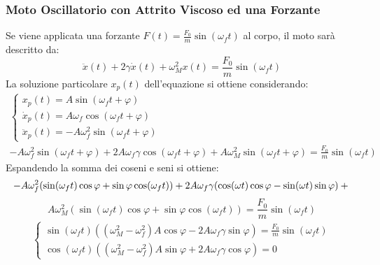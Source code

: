 \documentclass{article}
\numberwithin{equation}{subsection}
\begin{document}
\subsubsection{Moto Oscillatorio con Attrito Viscoso ed una Forzante}
Se viene applicata una forzante $F(t)=\displaystyle\frac{F_0}{m}\sin(\omega_f t)$ 
al corpo, il moto sarà descritto da: 
\begin{equation}
    \ddot x(t)+2\gamma\dot x(t)+\omega_M^{2}x(t)=\displaystyle\frac{F_0}{m}\sin(\omega_f t)
\end{equation}
La soluzione particolare $x_p(t)$ dell'equazione si ottiene considerando:
\begin{gather*}
    \begin{cases}
        x_p(t)=A\sin(\omega_f t+\varphi)\\
        \dot x_p(t)=A\omega_f\cos(\omega_f t+\varphi)\\
        \ddot x_p(t)=-A\omega_f^{2}\sin(\omega_f t+\varphi)
    \end{cases}\\
    -A\omega_f^{2}\sin(\omega_f t+\varphi)+
    2A\omega_f\gamma \cos(\omega_f t+\varphi)+
    A\omega_M^{2}\sin(\omega_f t+\varphi)=\displaystyle\frac{F_0}{m}\sin(\omega_f t)
\end{gather*}
Espandendo la somma dei coseni e seni si ottiene: 
\begin{equation*}
    -A\omega_f^{2}(\sin(\omega_f t)\cos\varphi+\sin\varphi \cos(\omega_f t))+
    2A\omega_f\gamma(\cos(\omega t)\cos\varphi-\sin(\omega t)\sin\varphi)+\\
\end{equation*}
\begin{equation*}
    A\omega_M^{2}(\sin(\omega_f t)\cos\varphi+\sin\varphi \cos(\omega_f t))=\displaystyle\frac{F_0}{m}\sin(\omega_f t)
\end{equation*}
\begin{gather*}
    \begin{cases}
        \sin(\omega_f t)((\omega_M^{2}-\omega_f^{2})A\cos\varphi-2A\omega_f\gamma \sin\varphi)=\displaystyle\frac{F_0}{m}\sin(\omega_f t)\\
        \cos(\omega_f t)((\omega_M^{2}-\omega_f^{2})A\sin\varphi+2A\omega_f\gamma \cos\varphi)=0
    \end{cases}
\end{gather*}
\end{document}
